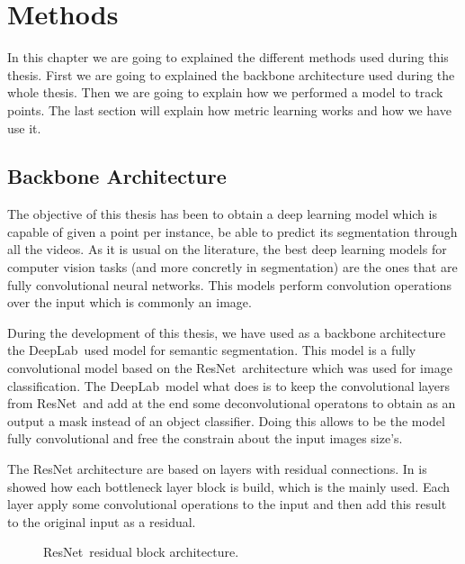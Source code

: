
\chapter{Methods}
\label{cha:methods}

In this chapter we are going to explained the different methods used during this thesis.
First we are going to explained the backbone architecture used during the whole thesis.
Then we are going to explain how we performed a model to track points.
The last section will explain how metric learning works and how we have use it.

\section{Backbone Architecture}
\label{sec:methods_backbone_architecture}

The objective of this thesis has been to obtain a deep learning model which is capable of given a point per instance, be able to predict its segmentation through all the videos.
As it is usual on the literature, the best deep learning models for computer vision tasks (and more concretly in segmentation) are the ones that are fully convolutional neural networks.
This models perform convolution operations over the input which is commonly an image.

During the development of this thesis, we have used as a backbone architecture the DeepLab~\deeplab used model for semantic segmentation.
This model is a fully convolutional model based on the ResNet~\resnet architecture which was used for image classification.
The DeepLab~\deeplab model what does is to keep the convolutional layers from ResNet~\resnet and add at the end some deconvolutional operatons to obtain as an output a mask instead of an object classifier.
Doing this allows to be the model fully convolutional and free the constrain about the input images size's.

The ResNet architecture are based on layers with residual connections. In  is showed how each bottleneck layer block is build, which is the mainly used.
Each layer apply some convolutional operations to the input and then add this result to the original input as a residual.

\begin{figure}[h]
  \centering
  \caption{ResNet~\resnet residual block architecture. }
  \label{fig:resnet_block}
\end{figure}

